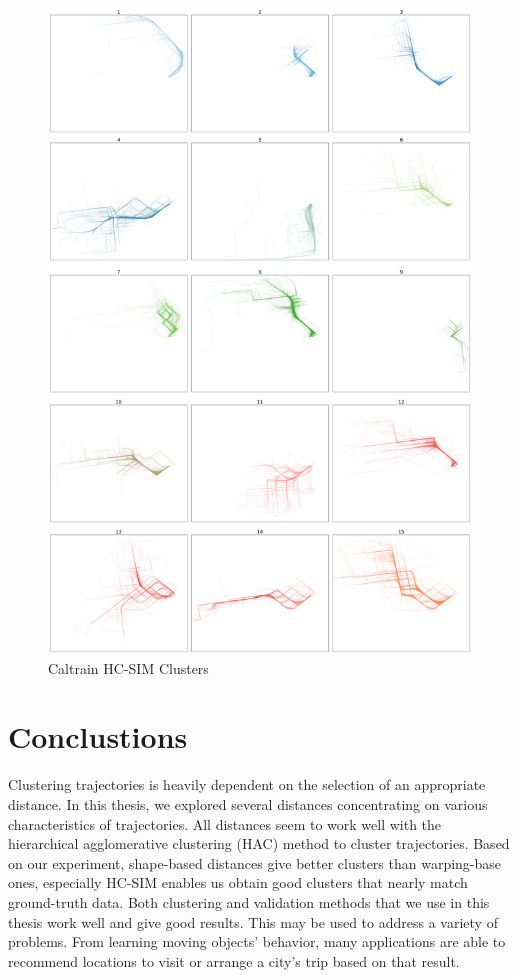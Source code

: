 \documentclass[a4paper, 12pt]{article}
\begin{document}
\begin{figure}[htbp!]
    \centering
    \includegraphics[width=1\textwidth]{Caltrain HCSIM.png}
    \caption{Caltrain HC-SIM Clusters}
    \label{fig44}
\end{figure}

\pagebreak

\section{Conclustions}
Clustering trajectories is heavily dependent on the selection of an appropriate distance. In this thesis, we explored several distances concentrating on various characteristics of trajectories. All distances seem to work well with the hierarchical agglomerative clustering (HAC) method to cluster trajectories. Based on our experiment, shape-based distances give better clusters than warping-base ones, especially HC-SIM enables us obtain good clusters that nearly match ground-truth data. Both clustering and validation methods that we use in this thesis work well and give good results. This may be used to address a variety of problems. From learning moving objects' behavior, many applications are able to recommend locations to visit or arrange a city's trip based on that result.

\pagebreak


\end{document}
